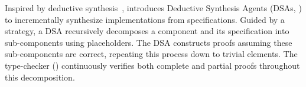Inspired by deductive synthesis~\cite{manna-waldinger,manna2006synthesis}, \sys{} introduces Deductive Synthesis Agents (DSAs, ) to incrementally synthesize implementations from specifications. Guided by a strategy, a DSA recursively decomposes a component and its specification into sub-components using placeholders. 
The DSA constructs proofs assuming these sub-components are correct, repeating this process down to trivial elements. The \coq{} type-checker () continuously verifies both complete and partial proofs throughout this decomposition.



